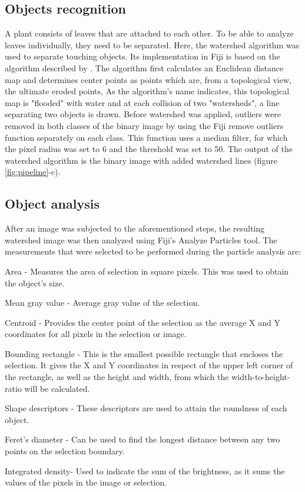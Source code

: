 \documentclass[paper=A4,bibliography=totocnumbered]{scrartcl}
\begin{document}
\subsection{Objects recognition}
A plant consists of leaves that are attached to each other. To be able to analyze leaves individually, they need to be separated. Here, the watershed algorithm was used to separate touching objects. Its implementation in Fiji is based on the algorithm described by \citet{Kunt.1990}. The algorithm first calculates an Euclidean distance map and determines center points as points which are, from a topological view, the ultimate eroded points, As the algorithm's name indicates, this topological map is "flooded" with water and at each collision of two "watersheds", a line separating two objects is drawn. Before watershed was applied, outliers were removed in both classes of the binary image by using the Fiji remove outliers function separately on each class. This function uses a median filter, for which the pixel radius was set to 6 and the threshold was set to 50. The output of the watershed algorithm is the binary image with added watershed lines (figure \ref{fig:pipeline}-c). 

\subsection{Object analysis}
After an image was subjected to the aforementioned steps, the resulting watershed image was then analyzed using Fiji's Analyze Particles tool. The measurements that were selected to be performed during the particle analysis are:

\begin{compactitem}
\item Area - Measures the area of selection in square pixels. This was used to obtain the object's size.
\item Mean gray value - Average gray value of the selection.
\item Centroid - Provides the center point of the selection as the average X and Y coordinates for all pixels in the selection or image.
\item Bounding rectangle - This is the smallest possible rectangle that encloses the selection. It gives the X and Y coordinates in respect of the upper left corner of the rectangle, as well as the height and width, from which the width-to-height-ratio will be calculated.
\item Shape descriptors - These descriptors are used to attain the roundness of each object.
\item Feret's diameter - Can be used to find the longest distance between any two points on the selection boundary.
\item Integrated density- Used to indicate the sum of the brightness, as it sums the values of the pixels in the image or selection.
\end{compactitem} 
\end{document}
